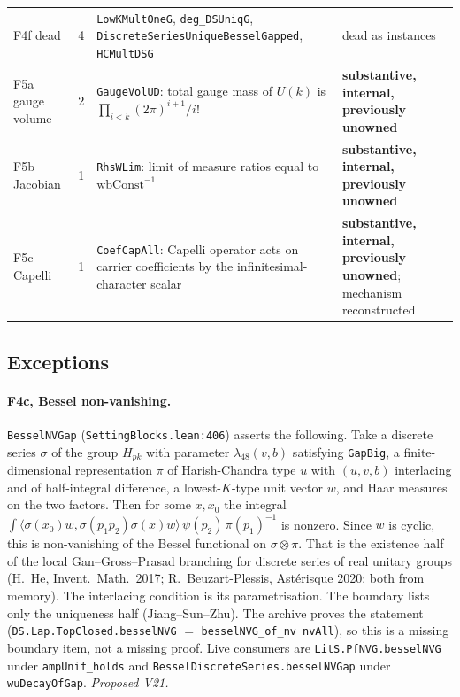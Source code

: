 \documentclass[11pt]{article}
\newcommand{\lean}[1]{\nolinkurl{#1}}
\newcommand{\Lpath}[1]{\nolinkurl{#1}}
\theoremstyle{remark}
\begin{document}
\begin{center}
\begin{longtable}{>{\raggedright}p{2.7cm}r>{\raggedright}p{5.2cm}>{\raggedright\arraybackslash}p{5.3cm}}
F4f dead & 4 & \lean{LowKMultOneG}, \lean{deg_DSUniqG}, \lean{DiscreteSeriesUniqueBesselGapped}, \lean{HCMultDSG} & dead as instances\\
F5a gauge volume & 2 & \lean{GaugeVolUD}: total gauge mass of $U(k)$ is $\prod_{i<k}(2\pi)^{i+1}/i!$ & \textbf{substantive, internal, previously unowned}\\
F5b Jacobian & 1 & \lean{RhsWLim}: limit of measure ratios equal to $\mathrm{wbConst}^{-1}$ & \textbf{substantive, internal, previously unowned}\\
F5c Capelli & 1 & \lean{CoefCapAll}: Capelli operator acts on carrier coefficients by the infinitesimal-character scalar & \textbf{substantive, internal, previously unowned}; mechanism reconstructed\\
\bottomrule
\end{longtable}
\end{center}

\subsection{Exceptions}

\paragraph{F4c, Bessel non-vanishing.} \lean{BesselNVGap} (\Lpath{SettingBlocks.lean:406}) asserts the following. Take a discrete series $\sigma$ of the group $H_{pk}$ with parameter $\lambda_{48}(v,b)$ satisfying \lean{GapBig}, a finite-dimensional representation $\pi$ of Harish-Chandra type $u$ with $(u,v,b)$ interlacing and of half-integral difference, a lowest-$K$-type unit vector $w$, and Haar measures on the two factors. Then for some $x,x_0$ the integral $\int\langle\sigma(x_0)w,\sigma(p_1p_2)\sigma(x)w\rangle\,\overline{\psi(p_2)}\,\pi(p_1)^{-1}$ is nonzero. Since $w$ is cyclic, this is non-vanishing of the Bessel functional on $\sigma\otimes\pi$. That is the existence half of the local Gan--Gross--Prasad branching for discrete series of real unitary groups (H.~He, Invent.\ Math.\ 2017; R.~Beuzart-Plessis, Astérisque 2020; both from memory). The interlacing condition is its parametrisation. The boundary lists only the uniqueness half (Jiang--Sun--Zhu). The archive proves the statement (\lean{DS.Lap.TopClosed.besselNVG} $=$ \lean{besselNVG_of_nv}~\lean{nvAll}), so this is a missing boundary item, not a missing proof. Live consumers are \lean{LitS.PfNVG.besselNVG} under \lean{ampUnif_holds} and \lean{BesselDiscreteSeries.besselNVGap} under \lean{wuDecayOfGap}. \emph{Proposed V21.}
\end{document}

